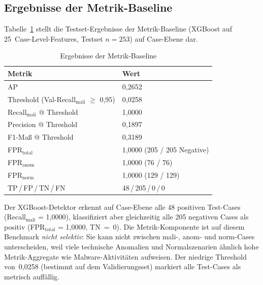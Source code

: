 \subsection{Ergebnisse der Metrik-Baseline}
\label{sec:baseline}

Tabelle~\ref{tab:baseline_results} stellt die Testset-Ergebnisse der Metrik-Baseline (XGBoost auf 25~Case-Level-Features, Testset $n=253$) auf Case-Ebene dar.

\begin{table}[H]
  \centering
  \caption{Ergebnisse der Metrik-Baseline}
  \label{tab:baseline_results}
  \begin{tabular}{ll}
    \hline
    \textbf{Metrik} & \textbf{Wert} \\
    \hline
    AP                                                   & 0{,}2652 \\
    Threshold (Val-Recall$_{\text{mali}}$ $\geq$ 0{,}95) & 0{,}0258 \\
    Recall$_{\text{mali}}$ @ Threshold                   & 1{,}0000 \\
    Precision @ Threshold                                & 0{,}1897 \\
    F1-Maß @ Threshold                                   & 0{,}3189 \\
    FPR$_{\text{total}}$                                 & 1{,}0000 (205 / 205 Negative) \\
    FPR$_{\text{anom}}$                                  & 1{,}0000 (76 / 76) \\
    FPR$_{\text{norm}}$                                  & 1{,}0000 (129 / 129) \\
    TP\,/\,FP\,/\,TN\,/\,FN                             & 48\,/\,205\,/\,0\,/\,0 \\
    \hline
  \end{tabular}
\end{table}

Der XGBoost-Detektor erkennt auf Case-Ebene alle 48 positiven Test-Cases
(Recall$_{\text{mali}}$ = 1{,}0000), klassifiziert aber gleichzeitig alle 205 negativen Cases als positiv (FPR$_{\text{total}}$ = 1{,}0000, TN~=~0). Die Metrik-Komponente ist auf diesem Benchmark \emph{nicht selektiv}: Sie kann nicht zwischen mali-, anom- und norm-Cases unterscheiden, weil viele technische Anomalien und Normalszenarien ähnlich hohe Metrik-Aggregate wie Malware-Aktivitäten aufweisen. Der niedrige Threshold von~0{,}0258 (bestimmt auf dem Validierungsset) markiert alle Test-Cases als metrisch auffällig.

